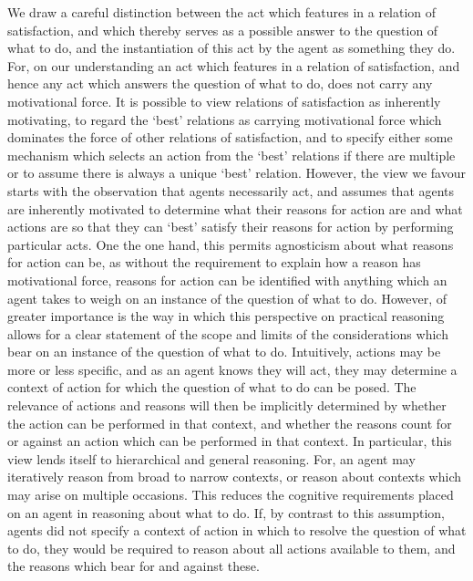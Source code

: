 \documentclass[10pt]{article}
\begin{document}
We draw a careful distinction between the act which features in a relation of satisfaction, and which thereby serves as a possible answer to the question of what to do, and the instantiation of this act by the agent as something they do.
For, on our understanding an act which features in a relation of satisfaction, and hence any act which answers the question of what to do, does not carry any motivational force.
It is possible to view relations of satisfaction as inherently motivating, to regard the `best' relations as carrying motivational force which dominates the force of other relations of satisfaction, and to specify either some mechanism which selects an action from the `best' relations if there are multiple or to assume there is always a unique `best' relation.
However, the view we favour starts with the observation that agents necessarily act, and assumes that agents are inherently motivated to determine what their reasons for action are and what actions are so that they can `best' satisfy their reasons for action by performing particular acts.
One the one hand, this permits agnosticism about what reasons for action can be, as without the requirement to explain how a reason has motivational force, reasons for action can be identified with anything which an agent takes to weigh on an instance of the question of what to do.
However, of greater importance is the way in which this perspective on practical reasoning allows for a clear statement of the scope and limits of the considerations which bear on an instance of the question of what to do.
Intuitively, actions may be more or less specific, and as an agent knows they will act, they may determine a context of action for which the question of what to do can be posed.
The relevance of actions and reasons will then be implicitly determined by whether the action can be performed in that context, and whether the reasons count for or against an action which can be performed in that context.
In particular, this view lends itself to hierarchical and general reasoning.
For, an agent may iteratively reason from broad to narrow contexts, or reason about contexts which may arise on multiple occasions.
This reduces the cognitive requirements placed on an agent in reasoning about what to do.
If, by contrast to this assumption, agents did not specify a context of action in which to resolve the question of what to do, they would be required to reason about all actions available to them, and the reasons which bear for and against these.
\end{document}
